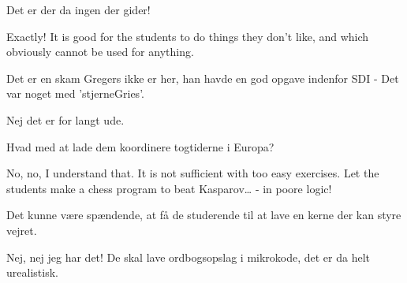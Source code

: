 \documentclass[a4paper,11pt]{article}
\begin{document}
\begin{sketch}
     Det er der da ingen der gider!

     Exactly! It is good for the students to do things they don't like, and which obviously cannot be used for anything.

     Det er en skam Gregers ikke er her, han havde en god opgave indenfor SDI - Det var noget med 'stjerneGries'.

     Nej det er for langt ude.


     Hvad med at lade dem koordinere togtiderne i Europa?

     No, no, I understand that. It is not sufficient with too easy exercises. Let the students make a chess program to beat Kasparov\ldots
             - in poore logic! 

     Det kunne være spændende, at få de studerende til at lave en kerne der kan styre vejret.

     Nej, nej jeg har det! De skal lave ordbogsopslag i mikrokode, det er da helt urealistisk.

\end{sketch}
\end{document}

